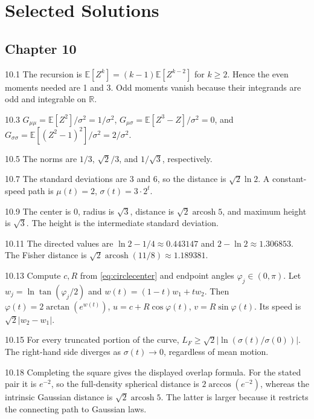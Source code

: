 \documentclass[11pt,oneside,openany]{book}
\theoremstyle{definition}
\theoremstyle{remark}
\newenvironment{answers}{\begin{description}[leftmargin=2.9em,labelwidth=2.5em,labelsep=.4em,itemsep=8pt,font=\normalfont\bfseries]}{\end{description}}
\newcommand{\R}{\mathbb{R}}
\newcommand{\E}{\mathbb{E}}
\newcommand{\arcosh}{\operatorname{arcosh}}
\numberwithin{equation}{chapter}
\begin{document}
\clearpage\backmatter
\chapter*{Selected Solutions}
\section*{Chapter 10}
\begin{answers}
\item[10.1] The recursion is $\E[Z^k]=(k-1)\E[Z^{k-2}]$ for $k\geq2$. Hence the even moments needed are 1 and 3. Odd moments vanish because their integrands are odd and integrable on $\R$.
\item[10.3] $G_{\mu\mu}=\E[Z^2]/\sigma^2=1/\sigma^2$, $G_{\mu\sigma}=\E[Z^3-Z]/\sigma^2=0$, and $G_{\sigma\sigma}=\E[(Z^2-1)^2]/\sigma^2=2/\sigma^2$.
\item[10.5] The norms are $1/3$, $\sqrt2/3$, and $1/\sqrt3$, respectively.
\item[10.7] The standard deviations are 3 and 6, so the distance is $\sqrt2\ln2$. A constant-speed path is $\mu(t)=2$, $\sigma(t)=3\cdot2^t$.
\item[10.9] The center is 0, radius is $\sqrt3$, distance is $\sqrt2\arcosh5$, and maximum height is $\sqrt3$. The height is the intermediate standard deviation.
\item[10.11] The directed values are $\ln2-1/4\approx0.443147$ and $2-\ln2\approx1.306853$. The Fisher distance is $\sqrt2\arcosh(11/8)\approx1.189381$.
\item[10.13] Compute $c,R$ from \eqref{eq:circlecenter} and endpoint angles $\varphi_j\in(0,\pi)$. Let $w_j=\ln\tan(\varphi_j/2)$ and $w(t)=(1-t)w_1+tw_2$. Then $\varphi(t)=2\arctan(e^{w(t)})$, $u=c+R\cos\varphi(t)$, $v=R\sin\varphi(t)$. Its speed is $\sqrt2|w_2-w_1|$.
\item[10.15] For every truncated portion of the curve, $L_F\geq\sqrt2|\ln(\sigma(t)/\sigma(0))|$. The right-hand side diverges as $\sigma(t)\to0$, regardless of mean motion.
\item[10.18] Completing the square gives the displayed overlap formula. For the stated pair it is $e^{-2}$, so the full-density spherical distance is $2\arccos(e^{-2})$, whereas the intrinsic Gaussian distance is $\sqrt2\arcosh5$. The latter is larger because it restricts the connecting path to Gaussian laws.
\end{answers}


\renewcommand{\bibname}{References and Further Reading}
\end{document}
